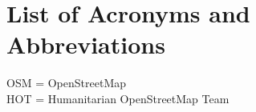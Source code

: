 \chapter*{List of Acronyms and Abbreviations}

OSM = OpenStreetMap \\
HOT = Humanitarian OpenStreetMap Team
